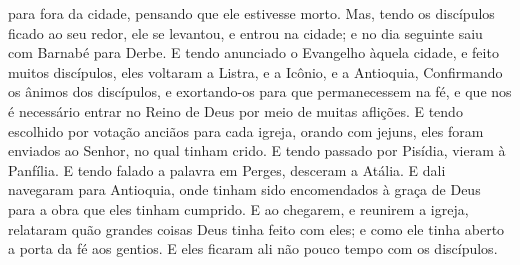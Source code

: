 {{} para fora da cidade, pensando que ele estivesse morto.
Mas, tendo os discípulos ficado ao seu redor, ele se levantou, e entrou na cidade; e no dia seguinte saiu com Barnabé para Derbe.
E tendo anunciado o Evangelho àquela cidade, e feito muitos discípulos, eles voltaram a Listra, e a Icônio, e a Antioquia,
Confirmando os ânimos dos discípulos, e exortando-os para que permanecessem na fé, e que nos é necessário entrar no Reino de Deus por meio de muitas aflições.
E tendo escolhido por votação anciãos
 para cada igreja, orando com jejuns, eles foram enviados ao Senhor, no qual tinham crido.
E tendo passado por Pisídia, vieram à Panfília.
E tendo falado a palavra em Perges, desceram a Atália.
E dali navegaram para Antioquia, onde tinham sido encomendados à graça de Deus para a obra que eles
{} tinham cumprido.
E ao chegarem, e reunirem a igreja, relataram quão grandes coisas Deus tinha feito com eles; e como ele tinha aberto a porta da fé aos gentios.
E eles ficaram ali não pouco tempo com os discípulos.

}
